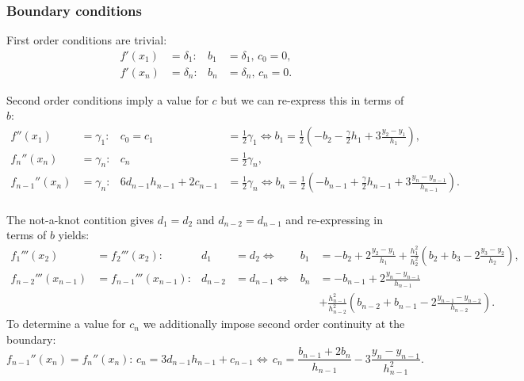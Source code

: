 \documentclass[11pt]{article}
\newcommand{\equivalent}{\Leftrightarrow}
\theoremstyle{break}            %
\begin{document}
\subsubsection*{Boundary conditions}
First order conditions are trivial:
\begin{equation*}
\begin{aligned}
    f'(x_1)&=\delta_1: & b_1 & = \delta_1,\, c_0 = 0,\\
    f'(x_n)&=\delta_n: & b_n & = \delta_n,\, c_n = 0.
\end{aligned}
\end{equation*}

Second order conditions imply a value for $c$ but we can re-express
this in terms of $b$:
\begin{equation*}
\begin{aligned}
    f''(x_1)&=\gamma_1: & c_0 = c_1 &= \frac{1}{2}\gamma_1 \equivalent
        b_1 = \frac{1}{2}\left(-b_2 -\frac{\gamma}{2} h_1
            + 3 \frac{y_2-y_1}{h_1}\right),\\
    f_n''(x_n)&=\gamma_n: & c_n &= \frac{1}{2}\gamma_n,\\
            f_{n-1}''(x_n)&=\gamma_n: & 6 d_{n-1}h_{n-1} + 2 c_{n-1} &= \frac{1}{2}\gamma_n \equivalent
            b_n = \frac{1}{2}\left(-b_{n-1} +\frac{\gamma}{2} h_{n-1}
            + 3 \frac{y_n-y_{n-1}}{h_{n-1}}\right).\\
\end{aligned}
\end{equation*}

The not-a-knot contition gives $d_1=d_2$ and $d_{n-2}=d_{n-1}$ and
re-expressing in terms of $b$ yields:
\begin{equation*}
\begin{aligned}
    f_1'''(x_2)&=f_2'''(x_2): & d_1&=d_2 \equivalent &
    b_1 & = -b_2+2\frac{y_2-y_1}{h_1}+\frac{h_1^2}{h_2^2}
        \left(b_2+b_3-2\frac{y_3-y_2}{h_2}\right),\\
    f_{n-2}'''(x_{n-1})&=f_{n-1}'''(x_{n-1}): & d_{n-2}&=d_{n-1}\equivalent&
    b_n & = -b_{n-1}+2\frac{y_n-y_{n-1}}{h_{n-1}}\\
        & & & & & +\frac{h_{n-1}^2}{h_{n-2}^2}
        \left(b_{n-2}+b_{n-1}-2\frac{y_{n-1}-y_{n-2}}{h_{n-2}}\right).
\end{aligned}
\end{equation*}
To determine a value for $c_n$ we additionally impose second order
continuity at the boundary:
\begin{equation*}
    f_{n-1}''(x_n)=f_n''(x_n): \, c_n =3d_{n-1}h_{n-1}+c_{n-1} \equivalent\,
        c_n=\frac{b_{n-1}+2 b_n}{h_{n-1}}-3\frac{y_n-y_{n-1}}{h_{n-1}^2}.
\end{equation*}
\end{document}
